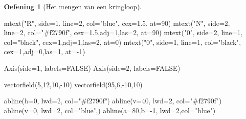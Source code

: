 \documentclass[
  a4paper,
]{scrbook}
\newenvironment{Shaded}{\begin{snugshade}}{\end{snugshade}}
\newcommand{\AttributeTok}[1]{\textcolor[rgb]{0.40,0.45,0.13}{#1}}
\newcommand{\ConstantTok}[1]{\textcolor[rgb]{0.56,0.35,0.01}{#1}}
\newcommand{\DecValTok}[1]{\textcolor[rgb]{0.68,0.00,0.00}{#1}}
\newcommand{\FloatTok}[1]{\textcolor[rgb]{0.68,0.00,0.00}{#1}}
\newcommand{\FunctionTok}[1]{\textcolor[rgb]{0.28,0.35,0.67}{#1}}
\newcommand{\NormalTok}[1]{\textcolor[rgb]{0.00,0.23,0.31}{#1}}
\newcommand{\SpecialCharTok}[1]{\textcolor[rgb]{0.37,0.37,0.37}{#1}}
\newcommand{\StringTok}[1]{\textcolor[rgb]{0.13,0.47,0.30}{#1}}
\theoremstyle{definition}
\newtheorem{exercise}{Oefening}[chapter]
\theoremstyle{remark}
\begin{document}
\begin{exercise}[Het mengen van een
kringloop]
\begin{Shaded}
\begin{Highlighting}[]
\FunctionTok{mtext}\NormalTok{(}\StringTok{"R"}\NormalTok{, }\AttributeTok{side=}\DecValTok{1}\NormalTok{, }\AttributeTok{line=}\DecValTok{2}\NormalTok{, }\AttributeTok{col=}\StringTok{"blue"}\NormalTok{, }\AttributeTok{cex=}\FloatTok{1.5}\NormalTok{, }\AttributeTok{at=}\DecValTok{90}\NormalTok{)}
\FunctionTok{mtext}\NormalTok{(}\StringTok{"N"}\NormalTok{, }\AttributeTok{side=}\DecValTok{2}\NormalTok{, }\AttributeTok{line=}\DecValTok{2}\NormalTok{, }\AttributeTok{col=}\StringTok{"\#f2790f"}\NormalTok{, }\AttributeTok{cex=}\FloatTok{1.5}\NormalTok{,}\AttributeTok{adj=}\DecValTok{1}\NormalTok{,}\AttributeTok{las=}\DecValTok{2}\NormalTok{, }\AttributeTok{at=}\DecValTok{90}\NormalTok{)}
\FunctionTok{mtext}\NormalTok{(}\StringTok{"0"}\NormalTok{, }\AttributeTok{side=}\DecValTok{2}\NormalTok{, }\AttributeTok{line=}\DecValTok{1}\NormalTok{, }\AttributeTok{col=}\StringTok{"black"}\NormalTok{, }\AttributeTok{cex=}\DecValTok{1}\NormalTok{,}\AttributeTok{adj=}\DecValTok{1}\NormalTok{,}\AttributeTok{las=}\DecValTok{2}\NormalTok{, }\AttributeTok{at=}\DecValTok{0}\NormalTok{)}
\FunctionTok{mtext}\NormalTok{(}\StringTok{"0"}\NormalTok{, }\AttributeTok{side=}\DecValTok{1}\NormalTok{, }\AttributeTok{line=}\DecValTok{1}\NormalTok{, }\AttributeTok{col=}\StringTok{"black"}\NormalTok{, }\AttributeTok{cex=}\DecValTok{1}\NormalTok{,}\AttributeTok{adj=}\DecValTok{0}\NormalTok{,}\AttributeTok{las=}\DecValTok{1}\NormalTok{, }\AttributeTok{at=}\SpecialCharTok{{-}}\DecValTok{1}\NormalTok{)}

\FunctionTok{Axis}\NormalTok{(}\AttributeTok{side=}\DecValTok{1}\NormalTok{, }\AttributeTok{labels=}\ConstantTok{FALSE}\NormalTok{)}
\FunctionTok{Axis}\NormalTok{(}\AttributeTok{side=}\DecValTok{2}\NormalTok{, }\AttributeTok{labels=}\ConstantTok{FALSE}\NormalTok{)}

\FunctionTok{vectorfield}\NormalTok{(}\DecValTok{5}\NormalTok{,}\DecValTok{12}\NormalTok{,}\DecValTok{10}\NormalTok{,}\SpecialCharTok{{-}}\DecValTok{10}\NormalTok{)}
\FunctionTok{vectorfield}\NormalTok{(}\DecValTok{95}\NormalTok{,}\DecValTok{6}\NormalTok{,}\SpecialCharTok{{-}}\DecValTok{10}\NormalTok{,}\DecValTok{10}\NormalTok{)}

\FunctionTok{abline}\NormalTok{(}\AttributeTok{h=}\DecValTok{0}\NormalTok{, }\AttributeTok{lwd=}\DecValTok{2}\NormalTok{, }\AttributeTok{col=}\StringTok{"\#f2790f"}\NormalTok{)}
\FunctionTok{abline}\NormalTok{(}\AttributeTok{v=}\DecValTok{40}\NormalTok{, }\AttributeTok{lwd=}\DecValTok{2}\NormalTok{, }\AttributeTok{col=}\StringTok{"\#f2790f"}\NormalTok{)}
\FunctionTok{abline}\NormalTok{(}\AttributeTok{v=}\DecValTok{0}\NormalTok{, }\AttributeTok{lwd=}\DecValTok{2}\NormalTok{, }\AttributeTok{col=}\StringTok{"blue"}\NormalTok{,)}
\FunctionTok{abline}\NormalTok{(}\AttributeTok{a=}\DecValTok{80}\NormalTok{,}\AttributeTok{b=}\SpecialCharTok{{-}}\DecValTok{1}\NormalTok{, }\AttributeTok{lwd=}\DecValTok{2}\NormalTok{,}\AttributeTok{col=}\StringTok{"blue"}\NormalTok{)}
\end{Highlighting}
\end{Shaded}


\end{exercise}
\end{document}
